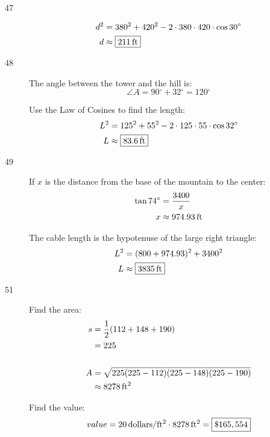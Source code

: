 \documentclass{exam}
\newcommand{\dg}{\ensuremath{^\circ}}
\begin{document}
\begin{description}
      \item[47]
        \begin{align*}
          d^2 & = 380^2 + 420^2 - 2 \cdot 380 \cdot 420 \cdot \cos 30 \dg \\
          d   & \approx \boxed{ \unit[211]{ft} } \\
        \end{align*}

      \item[48]
        The angle between the tower and the hill is:
        \[
          \angle A = 90 \dg + 32 \dg = 120 \dg
        \]

        Use the Law of Cosines to find the length:
        \begin{align*}
          L^2 & = 125^2 + 55^2 - 2 \cdot 125 \cdot 55 \cdot \cos 32 \dg \\
          L   & \approx \boxed{ \unit[83.6]{ft} } \\
        \end{align*}

      \pagebreak

      \item[49]
        If $x$ is the distance from the base of the mountain to the center:
        \begin{align*}
          \tan 74 \dg & = \frac{3400}{x} \\
          x           & \approx \unit[974.93]{ft} \\
        \end{align*}

        The cable length is the hypotenuse of the large right triangle:
        \begin{align*}
          L^2 &= (800 + 974.93)^2 + 3400^2 \\
          L &\approx \boxed{ \unit[3835]{ft} } \\
        \end{align*}

      \item[51]
        Find the area:
        \begin{align*}
          s & = \frac{1}{2} (112 + 148 + 190) \\
            & = 225 \\
          \\
          A & = \sqrt{225 (225 - 112)(225 - 148) (225 - 190)} \\
            & \approx \unit[8278]{ft^2} \\
        \end{align*}

        Find the value:
        \[
          value = \unit[20]{dollars/ft^2} \cdot \unit[8278]{ft^2} = \boxed{ \$165,554 }
        \]

    \end{description}
\end{document}
